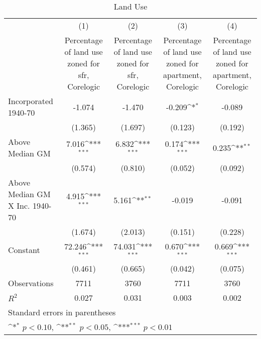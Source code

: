 \begin{table}[htbp]\centering
\def\sym#1{\ifmmode^{#1}\else\(^{#1}\)\fi}
\caption{Land Use}
\begin{tabular}{l*{4}{c}}
\hline\hline
                    &\multicolumn{1}{c}{(1)}&\multicolumn{1}{c}{(2)}&\multicolumn{1}{c}{(3)}&\multicolumn{1}{c}{(4)}\\
                    &\multicolumn{1}{c}{Percentage of land use zoned for sfr, Corelogic}&\multicolumn{1}{c}{Percentage of land use zoned for sfr, Corelogic}&\multicolumn{1}{c}{Percentage of land use zoned for apartment, Corelogic}&\multicolumn{1}{c}{Percentage of land use zoned for apartment, Corelogic}\\
\hline
Incorporated 1940-70&      -1.074         &      -1.470         &      -0.209\sym{*}  &      -0.089         \\
                    &     (1.365)         &     (1.697)         &     (0.123)         &     (0.192)         \\
[1em]
Above Median GM     &       7.016\sym{***}&       6.832\sym{***}&       0.174\sym{***}&       0.235\sym{**} \\
                    &     (0.574)         &     (0.810)         &     (0.052)         &     (0.092)         \\
[1em]
Above Median GM X Inc. 1940-70&       4.915\sym{***}&       5.161\sym{**} &      -0.019         &      -0.091         \\
                    &     (1.674)         &     (2.013)         &     (0.151)         &     (0.228)         \\
[1em]
Constant            &      72.246\sym{***}&      74.031\sym{***}&       0.670\sym{***}&       0.669\sym{***}\\
                    &     (0.461)         &     (0.665)         &     (0.042)         &     (0.075)         \\
\hline
Observations        &        7711         &        3760         &        7711         &        3760         \\
\(R^{2}\)           &       0.027         &       0.031         &       0.003         &       0.002         \\
\hline\hline
\multicolumn{5}{l}{\footnotesize Standard errors in parentheses}\\
\multicolumn{5}{l}{\footnotesize \sym{*} \(p<0.10\), \sym{**} \(p<0.05\), \sym{***} \(p<0.01\)}\\
\end{tabular}
\end{table}
